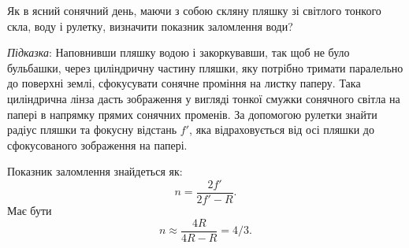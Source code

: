 \begin{problem}%
Як в ясний сонячний день, маючи з собою скляну пляшку зі світлого
тонкого скла, воду і рулетку, визначити показник заломлення води?
\begin{solution}
	\emph{Підказка}: Наповнивши пляшку водою і закоркувавши, так щоб не
	було бульбашки, через циліндричну частину пляшки, яку потрібно
	тримати паралельно до поверхні землі, сфокусувати сонячне проміння
	на листку паперу. Така циліндрична лінза дасть зображення у вигляді
	тонкої смужки сонячного світла на папері в напрямку прямих сонячних
	променів. За допомогою рулетки знайти радіус пляшки та фокусну
	відстань $f'$, яка відраховується від осі пляшки до сфокусованого
	зображення на папері.

	Показник заломлення знайдеться як:
	\begin{equation*}
		n = \frac{2f'}{2f' - R}.
	\end{equation*}
	Має бути
	\begin{equation*}
		n \approx \frac{4R}{4R - R} = 4/3.
	\end{equation*}
\end{solution}
\end{problem}




